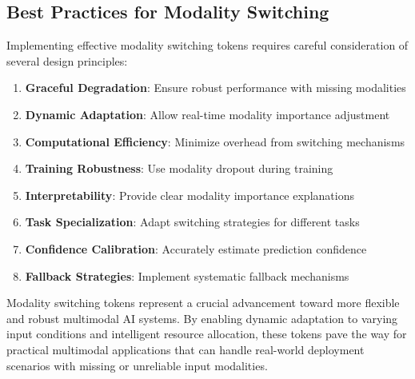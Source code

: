 \subsection{Best Practices for Modality Switching}

Implementing effective modality switching tokens requires careful consideration of several design principles:

\begin{enumerate}
\item \textbf{Graceful Degradation}: Ensure robust performance with missing modalities
\item \textbf{Dynamic Adaptation}: Allow real-time modality importance adjustment
\item \textbf{Computational Efficiency}: Minimize overhead from switching mechanisms
\item \textbf{Training Robustness}: Use modality dropout during training
\item \textbf{Interpretability}: Provide clear modality importance explanations
\item \textbf{Task Specialization}: Adapt switching strategies for different tasks
\item \textbf{Confidence Calibration}: Accurately estimate prediction confidence
\item \textbf{Fallback Strategies}: Implement systematic fallback mechanisms
\end{enumerate}

Modality switching tokens represent a crucial advancement toward more flexible and robust multimodal AI systems. By enabling dynamic adaptation to varying input conditions and intelligent resource allocation, these tokens pave the way for practical multimodal applications that can handle real-world deployment scenarios with missing or unreliable input modalities.

